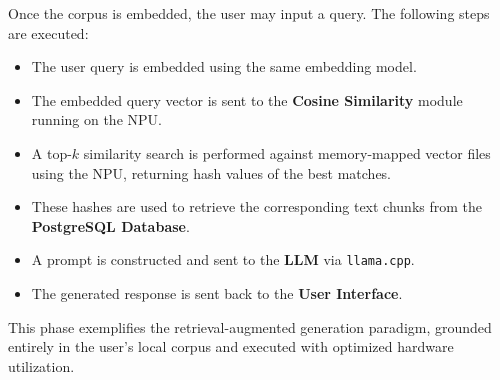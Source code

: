 Once the corpus is embedded, the user may input a query. The following steps are executed:

\begin{itemize}
    \item The user query is embedded using the same embedding model.
    \item The embedded query vector is sent to the \textbf{Cosine Similarity} module running on the NPU.
    \item A top-$k$ similarity search is performed against memory-mapped vector files using the NPU, returning hash values of the best matches.
    \item These hashes are used to retrieve the corresponding text chunks from the \textbf{PostgreSQL Database}.
    \item A prompt is constructed and sent to the \textbf{LLM} via \texttt{llama.cpp}.
    \item The generated response is sent back to the \textbf{User Interface}.
\end{itemize}

This phase exemplifies the retrieval-augmented generation paradigm, grounded entirely in the user’s local corpus and executed with optimized hardware utilization.

